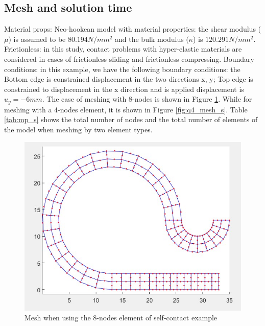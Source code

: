 \subsection{Mesh and solution time}
Material props: Neo-hookean model with material properties: the shear modulus ($\mu$) is assumed to be $80.194 N/mm^2$ and the bulk modulus ($\kappa$) is $120.291 N/mm^2$.
\vspace{0.38cm} \newline
Frictionless: in this study, contact problems with hyper-elastic materials are
considered in cases of frictionless sliding and frictionless compressing.
\vspace{0.38cm} \newline
Boundary conditions: in this example, we have the following boundary conditions: the Bottom edge is 
constrained displacement in the two directions x, y; Top edge is constrained to displacement in the 
x direction and is applied displacement is $u_y = - 6 mm$.
\vspace{0.38cm}
\newline
The case of meshing with 8-nodes is shown in Figure \ref{fig:q8_mesh_s}.
While for meshing with a 4-nodes element, it is shown in Figure \ref{fig:q4_mesh_s}.
Table \ref{tab:mp_s} shows the total number of nodes and the total number of elements of the model when meshing by two element types.
\vspace{0.01cm}
\newline

\begin{figure}[H]
    \centering
    \includegraphics[scale=0.72]{Figures/chapter5/q8_mesh_s.jpg}
    \decoRule
    \caption{Mesh when using the 8-nodes element of self-contact example }
    \label{fig:q8_mesh_s}
\end{figure}

